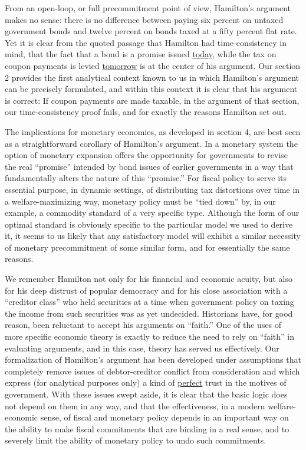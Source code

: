 \documentclass[12pt]{article}
\begin{document}
From an open-loop, or full precommitment point of view, Hamilton's argument makes no sense: there is no difference between paying six percent on untaxed government bonds and twelve percent on bonds taxed at a fifty percent flat rate. Yet it is clear from the quoted passage that Hamilton had time-consistency in mind, that the fact that a bond is a promise issued \underline{today}, while the tax on coupon payments is levied \underline{tomorrow} is at the center of his argument. Our section 2 provides the first analytical context known to us in which Hamilton's argument can be precisely formulated, and within this context it is clear that his argument is correct: If coupon payments are made taxable, in the argument of that section, our time-consistency proof fails, and for exactly the reasons Hamilton set out.

The implications for monetary economies, as developed in section 4, are best seen as a straightforward corollary of Hamilton's argument. In a monetary system the option of monetary expansion offers the opportunity for governments to revise the real ``promise'' intended by bond issues of earlier governments in a way that fundamentally alters the nature of this ``promise.'' For fiscal policy to serve its essential purpose, in dynamic settings, of distributing tax distortions over time in a welfare-maximizing way, monetary policy must be ``tied down'' by, in our example, a commodity standard of a very specific type. Although the form of our optimal standard is obviously specific to the particular model we used to derive it, it seems to us likely that any satisfactory model will exhibit a similar necessity of monetary precommitment of some similar form, and for essentially the same reasons.

We remember Hamilton not only for his financial and economic acuity, but also for his deep distrust of popular democracy and for his close association with a ``creditor class'' who held securities at a time when government policy on taxing the income from such securities was as yet undecided. Historians have, for good reason, been reluctant to accept his arguments on ``faith.'' One of the uses of more specific economic theory is exactly to reduce the need to rely on ``faith'' in evaluating arguments, and in this case, theory has served us effectively. Our formalization of Hamilton's argument has been developed under assumptions that completely remove issues of debtor-creditor conflict from consideration and which express (for analytical purposes only) a kind of \underline{perfect} trust in the motives of government. With these issues swept aside, it is clear that the basic logic does not depend on them in any way, and that the effectiveness, in a modern welfare-economic sense, of fiscal and monetary policy depends in an important way on the ability to make fiscal commitments that are binding in a real sense, and to severely limit the ability of monetary policy to undo such commitments.
\end{document}
